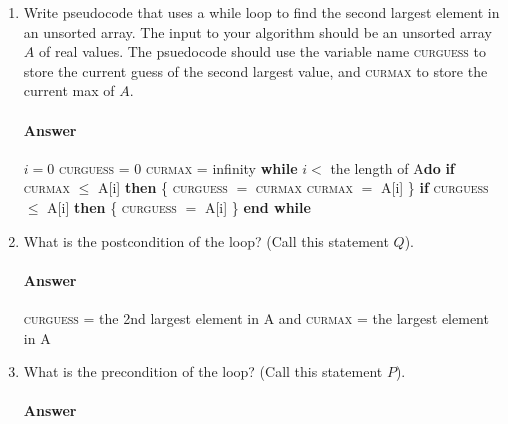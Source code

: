 \documentclass{article}
\begin{document}
\begin{enumerate}

    \item Write pseudocode that uses a while loop to find the second largest
        element in an unsorted array.  The input to your algorithm should be an
        unsorted array $A$ of real values.  The psuedocode should use the
        variable name \textsc{curguess} to store the current guess of the second
        largest value, and \textsc{curmax} to store the current max of $A$.

        \paragraph{Answer}


        $i = 0$ \newline
        \textsc{curguess} = 0 \newline
        \textsc{curmax} = infinity \newline
        \textbf{while} $i \less$ the length of A\textbf{do} \newline
        \textbf{if} \textsc{curmax} $\leq$ A[i] \textbf{then} \{\newline 
        \textsc{curguess} $=$ \textsc{curmax} \newline
        \textsc{curmax} $=$ A[i] \} \newline 
        \textbf{if} \textsc{curguess} $\leq$ A[i] \textbf{then} \{ \newline 
        \textsc{curguess} $=$ A[i] \} \newline
        \textbf{end while}

    \item What is the postcondition of the loop? (Call this statement $Q$).

        \paragraph{Answer}

        \textsc{curguess} = the 2nd largest element in A and \textsc{curmax} = the largest element in A

    \item What is the precondition of the loop? (Call this statement $P$).

        \paragraph{Answer}


\end{enumerate}
\end{document}
